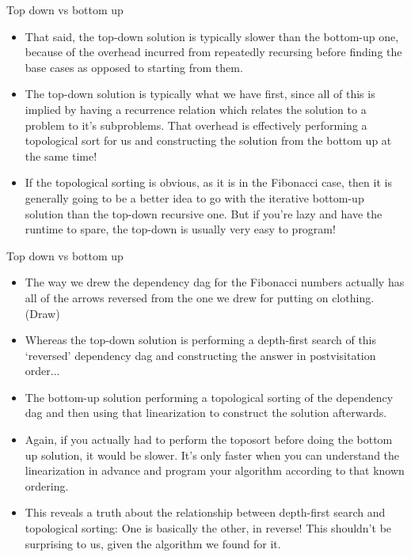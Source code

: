 \documentclass{beamer}
\begin{document}
\begin{frame}{Top down vs bottom up}
    \begin{itemize}
        \item That said, the top-down solution is typically slower than the bottom-up one, because of the overhead incurred from repeatedly recursing before finding the base cases as opposed to starting from them. \pause  
        \item The top-down solution is typically what we have first, since all of this is implied by having a recurrence relation which relates the solution to a problem to it's subproblems. That overhead is effectively performing a topological sort for us and constructing the solution from the bottom up at the same time! 
        \item If the topological sorting is obvious, as it is in the Fibonacci case, then it is generally going to be a better idea to go with the iterative bottom-up solution than the top-down recursive one. But if you're lazy and have the runtime to spare, the top-down is usually very easy to program!
    \end{itemize}
\end{frame}

\begin{frame}{Top down vs bottom up}
    \begin{itemize}
        \item The way we drew the dependency dag for the Fibonacci numbers actually has all of the arrows reversed from the one we drew for putting on clothing. (Draw) \pause 
        \item Whereas the top-down solution is performing a depth-first search of this `reversed' dependency dag and constructing the answer in postvisitation order...
        \item The bottom-up solution performing a topological sorting of the dependency dag and then using that linearization to construct the solution afterwards. \pause
        \item Again, if you actually had to perform the toposort before doing the bottom up solution, it would be slower. It's only faster when you can understand the linearization in advance and program your algorithm according to that known ordering. \pause 
        \item This reveals a truth about the relationship between depth-first search and topological sorting: One is basically the other, in reverse! This shouldn't be surprising to us, given the algorithm we found for it.
    \end{itemize}
\end{frame}
\end{document}
